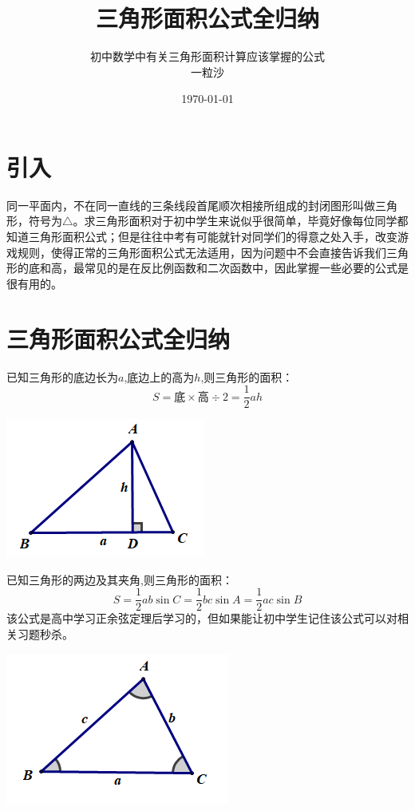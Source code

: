 \documentclass[10pt]{ctexart}
\title{\huge\heiti 三角形面积公式全归纳}
\author{初中数学中有关三角形面积计算应该掌握的公式\\一粒沙}
\date{\today}
\begin{document}
\maketitle
\tableofcontents


\section{引入}
同一平面内，不在同一直线的三条线段首尾顺次相接所组成的封闭图形叫做三角形，符号为$\triangle$。求三角形面积对于初中学生来说似乎很简单，毕竟好像每位同学都知道三角形面积公式；但是往往中考有可能就针对同学们的得意之处入手，改变游戏规则，使得正常的三角形面积公式无法适用，因为问题中不会直接告诉我们三角形的底和高，最常见的是在反比例函数和二次函数中，因此掌握一些必要的公式是很有用的。
\section{三角形面积公式全归纳}

\begin{minipage}[t]{0.7\textwidth}
\begin{dkli}{}{}
已知三角形的底边长为$a$,底边上的高为$h$,则三角形的面积：
\[S=\text{底}\times \text{高}\div 2=\dfrac{1}{2}ah\]
\end{dkli}
\end{minipage}
\begin{minipage}[t]{0.3\textwidth}
\includegraphics[scale=0.6]{figure/mj-01.png}
\end{minipage}

\begin{minipage}[t]{0.7\textwidth}
\begin{dkli}{}{}
已知三角形的两边及其夹角,则三角形的面积：
\[S=\dfrac{1}{2}ab \sin{C}=\dfrac{1}{2}bc \sin{A}=\dfrac{1}{2}ac \sin{B}\]
该公式是高中学习正余弦定理后学习的，但如果能让初中学生记住该公式可以对相关习题秒杀。
\end{dkli}
\end{minipage}
\begin{minipage}[t]{0.3\textwidth}
\includegraphics[scale=0.6]{figure/mj-02.png}
\end{minipage}
\end{document}
